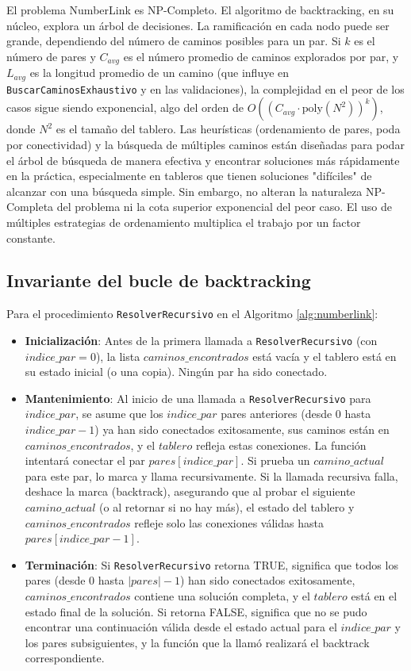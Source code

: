 \documentclass[spanish]{article}
\numberwithin{equation}{section}
\numberwithin{figure}{section}
\theoremstyle{definition}
\begin{document}
El problema NumberLink es NP-Completo. El algoritmo de backtracking, en su núcleo, explora un árbol de decisiones. La ramificación en cada nodo puede ser grande, dependiendo del número de caminos posibles para un par. Si $k$ es el número de pares y $C_{avg}$ es el número promedio de caminos explorados por par, y $L_{avg}$ es la longitud promedio de un camino (que influye en \texttt{BuscarCaminosExhaustivo} y en las validaciones), la complejidad en el peor de los casos sigue siendo exponencial, algo del orden de $O((C_{avg} \cdot \text{poly}(N^2))^k)$, donde $N^2$ es el tamaño del tablero.
Las heurísticas (ordenamiento de pares, poda por conectividad) y la búsqueda de múltiples caminos están diseñadas para podar el árbol de búsqueda de manera efectiva y encontrar soluciones más rápidamente en la práctica, especialmente en tableros que tienen soluciones "difíciles" de alcanzar con una búsqueda simple. Sin embargo, no alteran la naturaleza NP-Completa del problema ni la cota superior exponencial del peor caso. El uso de múltiples estrategias de ordenamiento multiplica el trabajo por un factor constante.


\subsection{Invariante del bucle de backtracking}
Para el procedimiento \texttt{ResolverRecursivo} en el Algoritmo \ref{alg:numberlink}:
\begin{itemize}
    \item \textbf{Inicialización}: Antes de la primera llamada a \texttt{ResolverRecursivo} (con $indice\_par = 0$), la lista $caminos\_encontrados$ está vacía y el tablero está en su estado inicial (o una copia). Ningún par ha sido conectado.
    \item \textbf{Mantenimiento}: Al inicio de una llamada a \texttt{ResolverRecursivo} para $indice\_par$, se asume que los $indice\_par$ pares anteriores (desde $0$ hasta $indice\_par-1$) ya han sido conectados exitosamente, sus caminos están en $caminos\_encontrados$, y el $tablero$ refleja estas conexiones. La función intentará conectar el par $pares[indice\_par]$. Si prueba un $camino\_actual$ para este par, lo marca y llama recursivamente. Si la llamada recursiva falla, deshace la marca (backtrack), asegurando que al probar el siguiente $camino\_actual$ (o al retornar si no hay más), el estado del tablero y $caminos\_encontrados$ refleje solo las conexiones válidas hasta $pares[indice\_par-1]$.
    \item \textbf{Terminación}: Si \texttt{ResolverRecursivo} retorna TRUE, significa que todos los pares (desde $0$ hasta $|pares|-1$) han sido conectados exitosamente, $caminos\_encontrados$ contiene una solución completa, y el $tablero$ está en el estado final de la solución. Si retorna FALSE, significa que no se pudo encontrar una continuación válida desde el estado actual para el $indice\_par$ y los pares subsiguientes, y la función que la llamó realizará el backtrack correspondiente.
\end{itemize}
\end{document}
